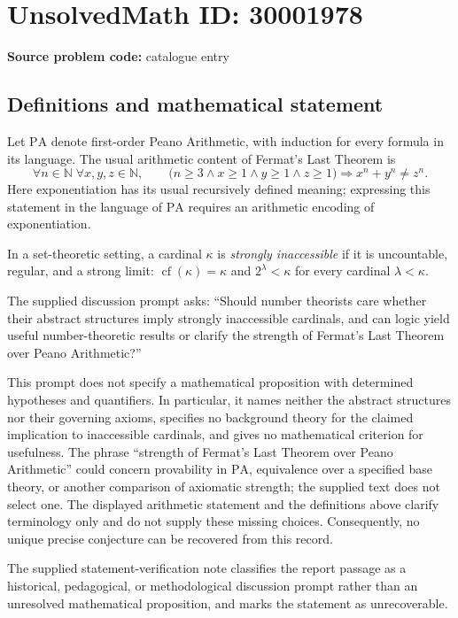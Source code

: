 \documentclass[11pt]{article}
\newcommand{\N}{\mathbb{N}}
\begin{document}
\section*{UnsolvedMath ID: 30001978}
\textbf{Source problem code:} catalogue entry
\subsection{Definitions and mathematical statement}
Let \(\mathrm{PA}\) denote first-order Peano Arithmetic, with induction for every formula in its language. The usual arithmetic content of Fermat's Last Theorem is
\[
\forall n\in\N\;\forall x,y,z\in\N,\qquad
\bigl(n\geq 3\land x\geq 1\land y\geq 1\land z\geq 1\bigr)
\Longrightarrow x^n+y^n\neq z^n.
\]
Here exponentiation has its usual recursively defined meaning; expressing this statement in the language of \(\mathrm{PA}\) requires an arithmetic encoding of exponentiation.

In a set-theoretic setting, a cardinal \(\kappa\) is \emph{strongly inaccessible} if it is uncountable, regular, and a strong limit: \(\operatorname{cf}(\kappa)=\kappa\) and \(2^\lambda<\kappa\) for every cardinal \(\lambda<\kappa\).

The supplied discussion prompt asks: ``Should number theorists care whether their abstract structures imply strongly inaccessible cardinals, and can logic yield useful number-theoretic results or clarify the strength of Fermat's Last Theorem over Peano Arithmetic?''

This prompt does not specify a mathematical proposition with determined hypotheses and quantifiers. In particular, it names neither the abstract structures nor their governing axioms, specifies no background theory for the claimed implication to inaccessible cardinals, and gives no mathematical criterion for usefulness. The phrase ``strength of Fermat's Last Theorem over Peano Arithmetic'' could concern provability in \(\mathrm{PA}\), equivalence over a specified base theory, or another comparison of axiomatic strength; the supplied text does not select one. The displayed arithmetic statement and the definitions above clarify terminology only and do not supply these missing choices. Consequently, no unique precise conjecture can be recovered from this record.

The supplied statement-verification note classifies the report passage as a historical, pedagogical, or methodological discussion prompt rather than an unresolved mathematical proposition, and marks the statement as unrecoverable.
\end{document}
